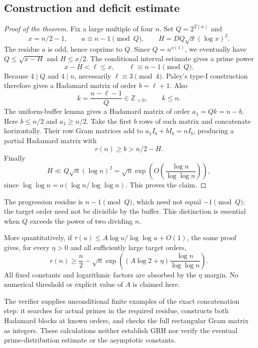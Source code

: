 \documentclass[11pt]{article}
\begin{document}
\subsection{Construction and deficit estimate}
\begin{proof}[Proof of the theorem]
Fix a large multiple of four $n$. Set $Q=2^{T(n)}$ and
\[
 x=n/2-1,\qquad a\equiv n-1\pmod Q,\qquad
 H=DQ\sqrt x(\log x)^2.
\]
The residue $a$ is odd, hence coprime to $Q$. Since $Q=n^{o(1)}$,
we eventually have $Q\le\sqrt{x-H}$ and $H\le x/2$.
The conditional interval estimate gives a prime power
\[
 x-H<\ell\le x,\qquad \ell\equiv n-1\pmod Q.
\]
Because $4\mid Q$ and $4\mid n$, necessarily $\ell\equiv3\pmod4$.
Paley's type-I construction therefore gives a Hadamard matrix of
order $b=\ell+1$. Also
\[
 k=\frac{n-\ell-1}{Q}\in\mathbb Z_{>0},\qquad k\le n.
\]
The uniform-buffer lemma gives a Hadamard matrix of order
$a_1=Qk=n-b$. Here $b\le n/2$ and $a_1\ge n/2$.
Take the first $b$ rows of each matrix and concatenate horizontally.
Their row Gram matrices add to
$a_1I_b+bI_b=nI_b$, producing a partial Hadamard matrix with
\[
 r(n)\ge b>n/2-H.
\]
Finally
\[
 H\ll Q\sqrt n(\log n)^2
   =\sqrt n\exp\!\left(O\!\left(\frac{\log n}{\log\log n}\right)\right),
\]
since $\log\log n=o(\log n/\log\log n)$. This proves the claim.
\end{proof}

The progression residue is $n-1\pmod Q$, which need not equal
$-1\pmod Q$: the target order need not be divisible by the buffer.
This distinction is essential when $Q$ exceeds the power of two
dividing $n$.

More quantitatively, if
$\tau(u)\le A\log u/\log\log u+O(1)$, the same proof gives,
for every $\eta>0$ and all sufficiently large target orders,
\[
 r(n)\ge\frac n2-
 \sqrt n\exp\!\left((A\log2+\eta)
                 \frac{\log n}{\log\log n}\right).
\]
All fixed constants and logarithmic factors are absorbed by the
$\eta$ margin. No numerical threshold or explicit value of $A$
is claimed here.

The verifier supplies unconditional finite examples of the exact
concatenation step: it searches for actual primes in the required
residue, constructs both Hadamard blocks at known orders, and checks
the full rectangular Gram matrix as integers. These calculations
neither establish GRH nor verify the eventual prime-distribution
estimate or the asymptotic constants.
\end{document}
